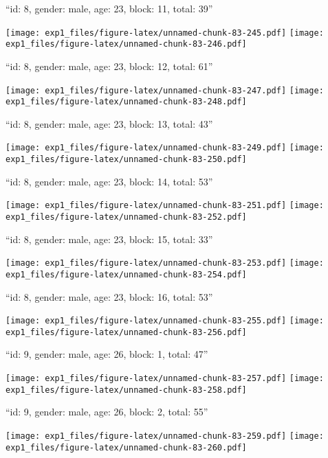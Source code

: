 \documentclass[11pt,,]{article}
\begin{document}
\newpage
[1] 

``id: 8, gender: male, age: 23, block: 11, total: 39''

\texttt{[image: exp1\_files/figure-latex/unnamed-chunk-83-245.pdf]}
\texttt{[image: exp1\_files/figure-latex/unnamed-chunk-83-246.pdf]}

\newpage
[1] 

``id: 8, gender: male, age: 23, block: 12, total: 61''

\texttt{[image: exp1\_files/figure-latex/unnamed-chunk-83-247.pdf]}
\texttt{[image: exp1\_files/figure-latex/unnamed-chunk-83-248.pdf]}

\newpage
[1] 

``id: 8, gender: male, age: 23, block: 13, total: 43''

\texttt{[image: exp1\_files/figure-latex/unnamed-chunk-83-249.pdf]}
\texttt{[image: exp1\_files/figure-latex/unnamed-chunk-83-250.pdf]}

\newpage
[1] 

``id: 8, gender: male, age: 23, block: 14, total: 53''

\texttt{[image: exp1\_files/figure-latex/unnamed-chunk-83-251.pdf]}
\texttt{[image: exp1\_files/figure-latex/unnamed-chunk-83-252.pdf]}

\newpage
[1] 

``id: 8, gender: male, age: 23, block: 15, total: 33''

\texttt{[image: exp1\_files/figure-latex/unnamed-chunk-83-253.pdf]}
\texttt{[image: exp1\_files/figure-latex/unnamed-chunk-83-254.pdf]}

\newpage
[1] 

``id: 8, gender: male, age: 23, block: 16, total: 53''

\texttt{[image: exp1\_files/figure-latex/unnamed-chunk-83-255.pdf]}
\texttt{[image: exp1\_files/figure-latex/unnamed-chunk-83-256.pdf]}

\newpage
[1] 

``id: 9, gender: male, age: 26, block: 1, total: 47''

\texttt{[image: exp1\_files/figure-latex/unnamed-chunk-83-257.pdf]}
\texttt{[image: exp1\_files/figure-latex/unnamed-chunk-83-258.pdf]}

\newpage
[1] 

``id: 9, gender: male, age: 26, block: 2, total: 55''

\texttt{[image: exp1\_files/figure-latex/unnamed-chunk-83-259.pdf]}
\texttt{[image: exp1\_files/figure-latex/unnamed-chunk-83-260.pdf]}
\end{document}

